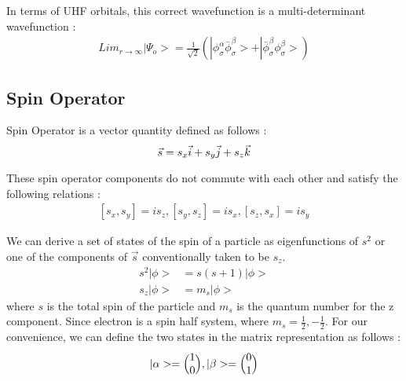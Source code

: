 \documentclass[11pt]{article}   	%
\begin{document}
	In terms of UHF orbitals, this correct  wavefunction is a multi-determinant wavefunction :\\
	\begin{equation}
	\begin{split}
		Lim_{r\rightarrow\infty}|\Psi_o>=\frac{1}{\sqrt{2}}(|\phi_{\sigma}^{\alpha}\bar
		{\phi}_{\sigma}^{\beta}>+|\bar{\phi}_{\sigma}^{\beta}\phi_{\sigma}^{\beta}>)
	\end{split}
	\end{equation}
	
\subsection{Spin Operator}
	Spin Operator is a vector quantity defined as follows :
	\begin{equation}
		\vec{s}=s_x \vec{i}+s_y\vec{j} + s_z\vec{k}\\
	\end{equation}
	
	These spin operator components do not commute with each other and satisfy the following relations :
	\begin{equation}
	\begin{split}
		[s_x,s_y]=is_z,   
		[s_y,s_z]=is_x,   
		[s_z,s_x]=is_y
	\end{split}
	\end{equation}
	
	We can derive a set of states of the spin of a particle as eigenfunctions of $s^2$ or one of the components of $\vec{s}$ conventionally taken to be $s_z$. \\
	\begin{equation}
	\begin{split}	
		s^2|\phi>&=s(s+1)|\phi>\\
		s_z|\phi>&=m_s|\phi>
	\end{split}
	\end{equation}
	where $s$ is the total spin of the particle and $m_s$ is the quantum number for the z component. 
	Since electron is a spin half system, where $m_s=\frac{1}{2} , -\frac{1}{2}$. 
	For our convenience, we can define the two states in the matrix representation as follows :\\
	\begin{equation}
		|\alpha>=\Big(\begin{matrix} 1\\ 0\end{matrix}\Big), 
		|\beta>=\Big(\begin{matrix} 0\\ 1\end{matrix}\Big)\\
	\end{equation}
	
\end{document}
